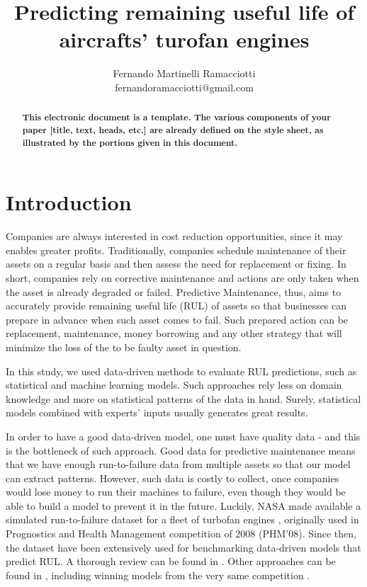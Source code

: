 \documentclass[letterpaper, 10 pt, conference, onecolumn]{ieeeconf}  %
\title{\LARGE \bf
Predicting remaining useful life of aircrafts' turofan engines}
\author{Fernando Martinelli Ramacciotti \\ 
fernandoramacciotti@gmail.com%
}
\begin{document}
\maketitle
\thispagestyle{plain}
\pagestyle{plain}


\begin{abstract}

\textbf{
This electronic document is a template. The various components of your paper [title, text, heads, etc.] are already defined on the style sheet, as illustrated by the portions given in this document.
}
\end{abstract}

\section{Introduction}
Companies are always interested in cost reduction opportunities, since it may enables greater profits. Traditionally, companies schedule maintenance of their assets on a regular basis and then assess the need for replacement or fixing. In short, companies rely on corrective maintenance and actions are only taken when the asset is already degraded or failed. Predictive Maintenance, thus, aims to accurately provide remaining useful life (RUL) of assets so that businesses can prepare in advance when such asset comes to fail. Such prepared action can be replacement, maintenance, money borrowing and any other strategy that will minimize the loss of the to be faulty asset in question. 

In this study, we used data-driven methods to evaluate RUL predictions, such as statistical and machine learning models. Such approaches rely less on domain knowledge and more on statistical patterns of the data in hand. Surely, statistical models combined with experts' inputs usually generates great results.

In order to have a good data-driven model, one must have quality data - and this is the bottleneck of such approach. Good data for predictive maintenance means that we have enough run-to-failure data from multiple assets so that our model can extract patterns. However, such data is costly to collect, once companies would lose money to run their machines to failure, even though they would be able to build a model to prevent it in the future. Luckily, NASA made available a simulated run-to-failure dataset for a fleet of turbofan engines \cite{frederick2007user, saxena2008damage}, originally used in Prognostics and Health Management competition of 2008 (PHM'08). Since then, the dataset have been extensively used for benchmarking data-driven models that predict RUL. A thorough review can be found in \cite{ramasso2014review, ramasso2014performance}. Other approaches can be found in \cite{gugulothu2017predicting, hu2012ensemble, mosallam2014data, sarkar2011data}, including winning models from the very same competition \cite{heimes2008recurrent, wang2008similarity}.
\end{document}

